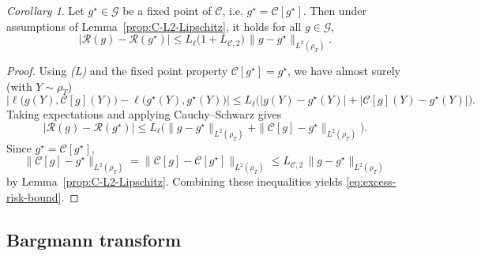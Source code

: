 \documentclass[11pt]{article}
\theoremstyle{remark}
\newtheorem{corollary}[proposition]{Corollary}
\numberwithin{equation}{section}
\begin{document}
\begin{corollary}
\label{cor:excess-risk-L2}
Let $g^\star\in\mathcal G$ be a fixed point of $\mathcal C$, i.e.
$g^\star=\mathcal C[g^\star]$. Then under assumptions of Lemma~\ref{prop:C-L2-Lipschitz}, it holds for all $g\in\mathcal G$,
\begin{equation}\label{eq:excess-risk-bound}
  \big|\mathcal R(g)-\mathcal R(g^\star)\big|
  \le
  L_\ell\bigl(1+L_{\mathcal C,2}\bigr)\,\|g-g^\star\|_{L^2(\rho_T)}.
\end{equation}

\end{corollary}
\begin{proof}
Using \emph{(L)} and the fixed point property $\mathcal C[g^\star]=g^\star$, we have
almost surely (with $Y\sim\rho_T$)
\[
  \Big|\ell\big(g(Y),\mathcal C[g](Y)\big)-\ell\big(g^\star(Y),g^\star(Y)\big)\Big|
  \le
  L_\ell\Big(|g(Y)-g^\star(Y)|+|\mathcal C[g](Y)-g^\star(Y)|\Big).
\]
Taking expectations and applying Cauchy--Schwarz gives
\[
  \big|\mathcal R(g)-\mathcal R(g^\star)\big|
  \le
  L_\ell\Big(\|g-g^\star\|_{L^2(\rho_T)}+\|\mathcal C[g]-g^\star\|_{L^2(\rho_T)}\Big).
\]
Since $g^\star=\mathcal C[g^\star]$,
\[
  \|\mathcal C[g]-g^\star\|_{L^2(\rho_T)}
  =
  \|\mathcal C[g]-\mathcal C[g^\star]\|_{L^2(\rho_T)}
  \le
  L_{\mathcal C, 2}\,\|g-g^\star\|_{L^2(\rho_T)}
\]
by Lemma~\ref{prop:C-L2-Lipschitz}. Combining these inequalities yields
\eqref{eq:excess-risk-bound}.
\end{proof}




\subsection{Bargmann transform}
\end{document}
